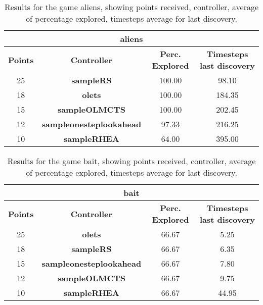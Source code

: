 \begin{table*}[!t]
\begin{center}
\begin{tabular}{|c|c|c|c|}
\multicolumn{4}{c}{\textbf{aliens}}\\
\hline
\textbf{Points} & \textbf{Controller} & \textbf{Perc. Explored} &  \textbf{Timesteps last discovery}\\
\hline
25 & \textbf{sampleRS} & 100.00 & 98.10
 \\
\hline
18 & \textbf{olets} & 100.00 & 184.35
 \\
\hline
15 & \textbf{sampleOLMCTS} & 100.00 & 202.45
 \\
\hline
12 & \textbf{sampleonesteplookahead} & 97.33 & 216.25
 \\
\hline
10 & \textbf{sampleRHEA} & 64.00 & 395.00
 \\
\hline
\end{tabular}
\caption{Results for the game aliens, showing points received, controller, average of percentage explored, timesteps average for last discovery.}
\label{tab:weights}
\end{center}
\end{table*}
\begin{table*}[!t]
\begin{center}
\begin{tabular}{|c|c|c|c|}
\multicolumn{4}{c}{\textbf{bait}}\\
\hline
\textbf{Points} & \textbf{Controller} & \textbf{Perc. Explored} &  \textbf{Timesteps last discovery}\\
\hline
25 & \textbf{olets} & 66.67 & 5.25
 \\
\hline
18 & \textbf{sampleRS} & 66.67 & 6.35
 \\
\hline
15 & \textbf{sampleonesteplookahead} & 66.67 & 7.80
 \\
\hline
12 & \textbf{sampleOLMCTS} & 66.67 & 9.75
 \\
\hline
10 & \textbf{sampleRHEA} & 66.67 & 44.95
 \\
\hline
\end{tabular}
\caption{Results for the game bait, showing points received, controller, average of percentage explored, timesteps average for last discovery.}
\label{tab:weights}
\end{center}
\end{table*}
